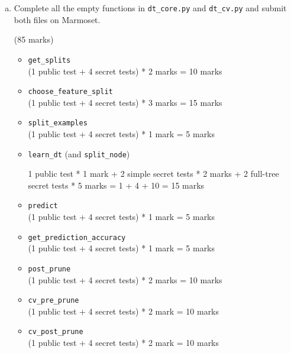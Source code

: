 \documentclass[12pt]{article}
\begin{document}
\begin{enumerate}[(a)]
\item 
Complete all the empty functions in \verb+dt_core.py+ and \verb+dt_cv.py+ and submit both files on Marmoset. 

\begin{markscheme}
(85 marks)

\begin{itemize}


\item \verb+get_splits+ \\
(1 public test + 4 secret tests) * 2 marks = 10 marks

\item \verb+choose_feature_split+ \\
(1 public test + 4 secret tests) * 3 marks = 15 marks

\item \verb+split_examples+ \\
(1 public test + 4 secret tests) * 1 mark = 5 marks

\item \verb+learn_dt+ (and \verb+split_node+)

1 public test * 1 mark 
+ 2 simple secret tests * 2 marks 
+ 2 full-tree secret tests * 5 marks 
= 1 + 4 + 10 = 15 marks

\item \verb+predict+ \\
(1 public test + 4 secret tests) * 1 mark = 5 marks

\item \verb+get_prediction_accuracy+ \\
(1 public test + 4 secret tests) * 1 mark = 5 marks

\item \verb+post_prune+ \\
(1 public test + 4 secret tests) * 2 marks = 10 marks

\item \verb+cv_pre_prune+ \\
(1 public test + 4 secret tests) * 2 mark = 10 marks 

\item \verb+cv_post_prune+ \\
(1 public test + 4 secret tests) * 2 mark = 10 marks

\end{itemize}

\end{markscheme}


\end{enumerate}
\end{document}
